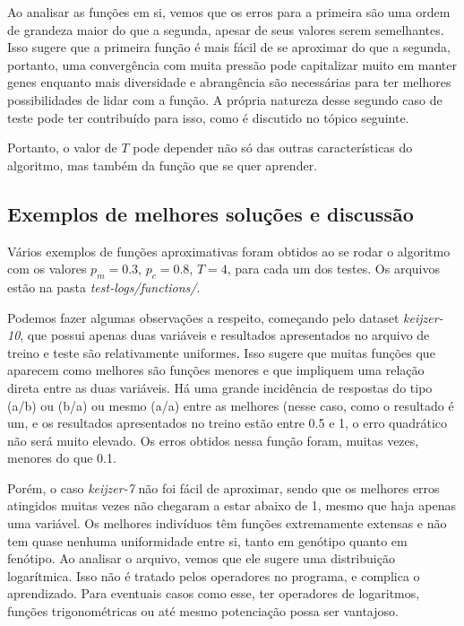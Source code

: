 \documentclass[11pt]{article}
\begin{document}
Ao analisar as funções em si, vemos que os erros para a primeira são uma ordem de grandeza maior do que a segunda, apesar de seus valores serem semelhantes. Isso sugere que a primeira função é mais fácil de se aproximar do que a segunda, portanto, uma convergência com muita pressão pode capitalizar muito em manter genes enquanto mais diversidade e abrangência são necessárias para ter melhores possibilidades de lidar com a função. A própria natureza desse segundo caso de teste pode ter contribuído para isso, como é discutido no tópico seguinte.

Portanto, o valor de $T$ pode depender não só das outras características do algoritmo, mas também da função que se quer aprender.

\subsection{Exemplos de melhores soluções e discussão}

Vários exemplos de funções aproximativas foram obtidos ao se rodar o algoritmo com os valores $p_m = 0.3$, $p_c = 0.8$, $T = 4$, para cada um dos testes. Os arquivos estão na pasta \textit{test-logs/functions/}.

Podemos fazer algumas observações a respeito, começando pelo dataset \textit{keijzer-10}, que possui apenas duas variáveis e resultados apresentados no arquivo de treino e teste são relativamente uniformes. Isso sugere que muitas funções que aparecem como melhores são funções menores e que impliquem uma relação direta entre as duas variáveis. Há uma grande incidência de respostas do tipo (a/b) ou (b/a) ou mesmo (a/a) entre as melhores (nesse caso, como o resultado é um, e os resultados apresentados no treino estão entre 0.5 e 1, o erro quadrático não será muito elevado. Os erros obtidos nessa função foram, muitas vezes, menores do que 0.1.

Porém, o caso \textit{keijzer-7} não foi fácil de aproximar, sendo que os melhores erros atingidos muitas vezes não chegaram a estar abaixo de 1, mesmo que haja apenas uma variável. Os melhores indivíduos têm funções extremamente extensas e não tem quase nenhuma uniformidade entre si, tanto em genótipo quanto em fenótipo. Ao analisar o arquivo, vemos que ele sugere uma distribuição logarítmica. Isso não é tratado pelos operadores no programa, e complica o aprendizado. Para eventuais casos como esse, ter operadores de logaritmos, funções trigonométricas ou até mesmo potenciação possa ser vantajoso.
\end{document}
